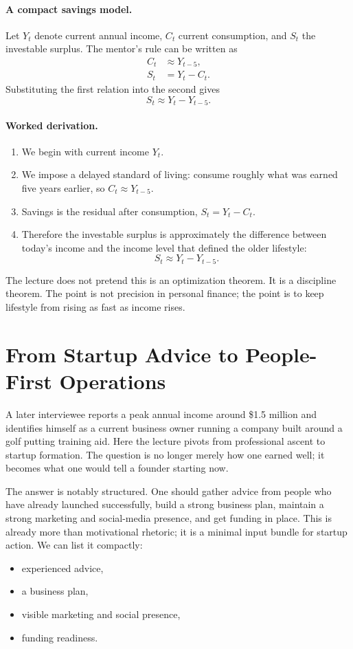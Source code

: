 \paragraph{A compact savings model.}
Let \(Y_t\) denote current annual income, \(C_t\) current consumption, and \(S_t\) the investable surplus. The mentor's rule can be written as
\begin{align}
C_t &\approx Y_{t-5}, \\
S_t &= Y_t - C_t.
\end{align}
Substituting the first relation into the second gives
\begin{equation}
S_t \approx Y_t - Y_{t-5}.
\end{equation}

\paragraph{Worked derivation.}
\begin{enumerate}
\item We begin with current income \(Y_t\).
\item We impose a delayed standard of living: consume roughly what was earned five years earlier, so \(C_t \approx Y_{t-5}\).
\item Savings is the residual after consumption, \(S_t = Y_t - C_t\).
\item Therefore the investable surplus is approximately the difference between today's income and the income level that defined the older lifestyle:
\[
S_t \approx Y_t - Y_{t-5}.
\]
\end{enumerate}

The lecture does not pretend this is an optimization theorem. It is a discipline theorem. The point is not precision in personal finance; the point is to keep lifestyle from rising as fast as income rises.

\section{From Startup Advice to People-First Operations}

A later interviewee reports a peak annual income around \$1.5 million and identifies himself as a current business owner running a company built around a golf putting training aid. Here the lecture pivots from professional ascent to startup formation. The question is no longer merely how one earned well; it becomes what one would tell a founder starting now.

The answer is notably structured. One should gather advice from people who have already launched successfully, build a strong business plan, maintain a strong marketing and social-media presence, and get funding in place. This is already more than motivational rhetoric; it is a minimal input bundle for startup action. We can list it compactly:
\begin{itemize}
\item experienced advice,
\item a business plan,
\item visible marketing and social presence,
\item funding readiness.
\end{itemize}

